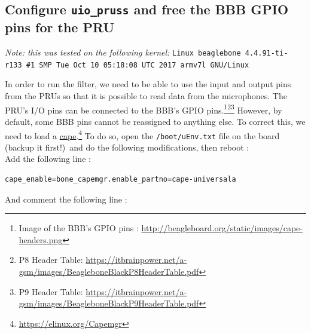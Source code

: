 \documentclass[]{report}
\begin{document}
%

\hypertarget{configure-uio-pruss-and-free-the-gpio-pins-for-the-pru}{%
	\subsection{\texorpdfstring{Configure \texttt{uio\_pruss} and free
			the BBB GPIO pins for the
			PRU}{Configure uio\textunderscore pruss and free the BBB GPIO pins for the PRU}}\label{configure-uio-pruss-and-free-the-gpio-pins-for-the-pru}}

\emph{Note: this was tested on the following kernel:}
\texttt{Linux beaglebone\ 4.4.91-ti-r133\ \#1\ SMP\ Tue\ Oct\ 10\ 05:18:08\ UTC\ 2017\ armv7l\ GNU/Linux}

In order to run the filter, we need to be able to use the input and
output pins from the PRUs so that it is possible to read data from the microphones. The PRU's I/O pins can be connected to the BBB's GPIO pins.\footnote{Image of the BBB's GPIO pins : \url{http://beagleboard.org/static/images/cape-headers.png}}\footnote{P8 Header Table: \url{https://itbrainpower.net/a-gsm/images/BeagleboneBlackP8HeaderTable.pdf}}\footnote{P9 Header Table: \url{https://itbrainpower.net/a-gsm/images/BeagleboneBlackP9HeaderTable.pdf}} However, by default, some BBB pins cannot be reassigned to anything else. To correct this, we need to
load a \href{https://elinux.org/Capemgr}{cape}.\footnote{\url{https://elinux.org/Capemgr}} To do so, open the
\texttt{/boot/uEnv.txt} file on the board (backup it first!)~and do the
following modifications, then reboot :\\

\noindent Add the following line :

\begin{verbatim}
cape_enable=bone_capemgr.enable_partno=cape-universala
\end{verbatim}

\noindent And comment the following line :
\end{document}
